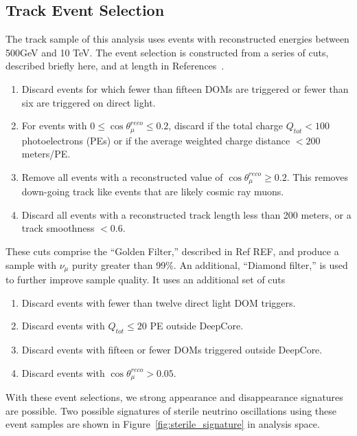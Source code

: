 \documentclass[main.tex]{subfiles}
\begin{document}
\subsection{Track Event Selection}

The track sample of this analysis uses events with reconstructed energies between 500GeV and 10 TeV. 
The event selection is constructed from a series of cuts, described briefly here, and at length in References~\cite{Aartsen_2020, Aartsen_2020_prd, axani2020sterile}. %

\begin{enumerate}
    \item Discard events for which fewer than fifteen DOMs are triggered or fewer than six are triggered on direct light.
    \item  For events with $0\leq\cos\theta_{\mu}^{reco}\leq 0.2$, discard if the total charge $Q_{tot}<100$ photoelectrons (PEs) or if the average weighted charge distance $<200$ meters/PE. 
    \item Remove all events with a reconstructed value of $\cos\theta_{\mu}^{reco}\geq 0.2$. This removes down-going track like events that are likely cosmic ray muons. 
    \item Discard all events with a reconstructed track length less than 200 meters, or a track smoothness $<0.6$.
\end{enumerate}

These cuts comprise the ``Golden Filter,'' described in Ref REF, and produce a sample with $\nu_{\mu}$ purity greater than 99\%. %
An additional, ``Diamond filter,'' is used to further improve sample quality. 
It uses an additional set of cuts
\begin{enumerate}
    \item Discard events with fewer than twelve direct light DOM triggers. 
    \item Discard events with $Q_{tot}\leq20$ PE outside DeepCore. 
    \item Discard events with fifteen or fewer DOMs triggered outside DeepCore. 
    \item Discard events with $\cos\theta_{\mu}^{reco}>0.05$.
\end{enumerate}

With these event selections, we strong appearance and disappearance signatures are possible. Two possible signatures of sterile neutrino oscillations using these event samples are shown in Figure~\ref{fig:sterile_signature} in analysis space. 
\end{document}
